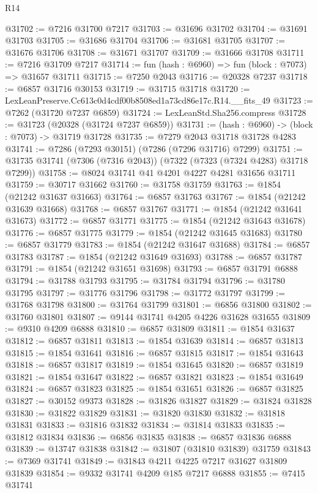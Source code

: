 \begin{lexlean}{R14}
\begin{coremodule}
@31702 := @7216 @31700 @7217
@31703 := @31696 @31702
@31704 := @31691 @31703
@31705 := @31686 @31704
@31706 := @31681 @31705
@31707 := @31676 @31706
@31708 := @31671 @31707
@31709 := @31666 @31708
@31711 := @7216 @31709 @7217
@31714 := fun (hash : @6960) => fun (block : @7073) => @31657 @31711
@31715 := @7250 @2043
@31716 := @20328 @7237
@31718 := @6857 @31716 @30153
@31719 := @31715 @31718
@31720 := LexLeanPreserve.Cc613c0d4cdf00b8508ed1a73cd86e17c.R14.__fits_49
@31723 := @7262 (@31720 @7237 @6859)
@31724 := LexLeanStd.Sha256.compress
@31728 := @31723 (@20328 (@31724 @7237 @6859))
@31731 := (hash : @6960) -> (block : @7073) -> @31719 @31728
@31735 := @7279 @2043 @31718 @31728 @4283
@31741 := @7286 (@7293 @30151) (@7286 (@7296 @31716) @7299)
@31751 := @31735 @31741 (@7306 (@7316 @2043)) (@7322 (@7323 (@7324 @4283) @31718 @7299))
@31758 := @8024 @31741 @41 @4201 @4227 @4281 @31656 @31711
@31759 := @30717 @31662
@31760 := @31758 @31759
@31763 := @1854 (@21242 @31637 @31663)
@31764 := @6857 @31763
@31767 := @1854 (@21242 @31639 @31668)
@31768 := @6857 @31767
@31771 := @1854 (@21242 @31641 @31673)
@31772 := @6857 @31771
@31775 := @1854 (@21242 @31643 @31678)
@31776 := @6857 @31775
@31779 := @1854 (@21242 @31645 @31683)
@31780 := @6857 @31779
@31783 := @1854 (@21242 @31647 @31688)
@31784 := @6857 @31783
@31787 := @1854 (@21242 @31649 @31693)
@31788 := @6857 @31787
@31791 := @1854 (@21242 @31651 @31698)
@31793 := @6857 @31791 @6888
@31794 := @31788 @31793
@31795 := @31784 @31794
@31796 := @31780 @31795
@31797 := @31776 @31796
@31798 := @31772 @31797
@31799 := @31768 @31798
@31800 := @31764 @31799
@31801 := @6856 @31800
@31802 := @31760 @31801
@31807 := @9144 @31741 @4205 @4226 @31628 @31655
@31809 := @9310 @4209 @6888
@31810 := @6857 @31809
@31811 := @1854 @31637
@31812 := @6857 @31811
@31813 := @1854 @31639
@31814 := @6857 @31813
@31815 := @1854 @31641
@31816 := @6857 @31815
@31817 := @1854 @31643
@31818 := @6857 @31817
@31819 := @1854 @31645
@31820 := @6857 @31819
@31821 := @1854 @31647
@31822 := @6857 @31821
@31823 := @1854 @31649
@31824 := @6857 @31823
@31825 := @1854 @31651
@31826 := @6857 @31825
@31827 := @30152 @9373
@31828 := @31826 @31827
@31829 := @31824 @31828
@31830 := @31822 @31829
@31831 := @31820 @31830
@31832 := @31818 @31831
@31833 := @31816 @31832
@31834 := @31814 @31833
@31835 := @31812 @31834
@31836 := @6856 @31835
@31838 := @6857 @31836 @6888
@31839 := @13747 @31838
@31842 := @31807 (@31810 @31839) @31759
@31843 := @7369 @31741
@31849 := @31843 @4211 @4225 @7217 @31627 @31809 @31839
@31854 := @9332 @31741 @4209 @185 @7217 @6888
@31855 := @7415 @31741

\end{coremodule}
\end{lexlean}
